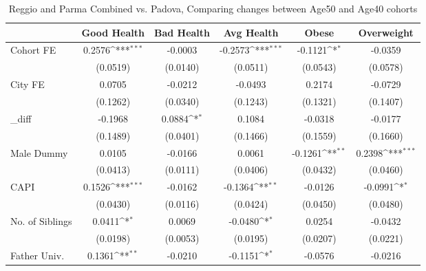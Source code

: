 \begin{table}[htbp]\centering
\def\sym#1{\ifmmode^{#1}\else\(^{#1}\)\fi}
\caption{Reggio and Parma Combined vs. Padova, Comparing changes between Age50 and Age40 cohorts}
\begin{tabular}{l*{5}{c}}
\toprule
            &\multicolumn{1}{c}{Good Health}&\multicolumn{1}{c}{Bad Health}&\multicolumn{1}{c}{Avg Health}&\multicolumn{1}{c}{Obese}&\multicolumn{1}{c}{Overweight}\\
\midrule
Cohort FE   &      0.2576\sym{***}&     -0.0003         &     -0.2573\sym{***}&     -0.1121\sym{*}  &     -0.0359         \\
            &    (0.0519)         &    (0.0140)         &    (0.0511)         &    (0.0543)         &    (0.0578)         \\
\addlinespace
City FE     &      0.0705         &     -0.0212         &     -0.0493         &      0.2174         &     -0.0729         \\
            &    (0.1262)         &    (0.0340)         &    (0.1243)         &    (0.1321)         &    (0.1407)         \\
\addlinespace
\_diff       &     -0.1968         &      0.0884\sym{*}  &      0.1084         &     -0.0318         &     -0.0177         \\
            &    (0.1489)         &    (0.0401)         &    (0.1466)         &    (0.1559)         &    (0.1660)         \\
\addlinespace
Male Dummy  &      0.0105         &     -0.0166         &      0.0061         &     -0.1261\sym{**} &      0.2398\sym{***}\\
            &    (0.0413)         &    (0.0111)         &    (0.0406)         &    (0.0432)         &    (0.0460)         \\
\addlinespace
CAPI        &      0.1526\sym{***}&     -0.0162         &     -0.1364\sym{**} &     -0.0126         &     -0.0991\sym{*}  \\
            &    (0.0430)         &    (0.0116)         &    (0.0424)         &    (0.0450)         &    (0.0480)         \\
\addlinespace
No. of Siblings&      0.0411\sym{*}  &      0.0069         &     -0.0480\sym{*}  &      0.0254         &     -0.0432         \\
            &    (0.0198)         &    (0.0053)         &    (0.0195)         &    (0.0207)         &    (0.0221)         \\
\addlinespace
Father Univ.&      0.1361\sym{**} &     -0.0210         &     -0.1151\sym{*}  &     -0.0576         &     -0.0216         \\

\end{tabular}
\end{table}

